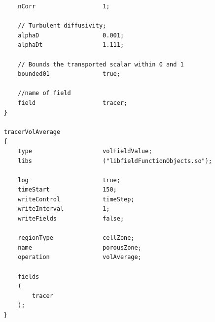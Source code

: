 \begin{refsection}
\begin{lstlisting}
		nCorr					1;

		// Turbulent diffusivity;
		alphaD					0.001;
		alphaDt					1.111;
		
		// Bounds the transported scalar within 0 and 1
		bounded01				true;
		
		//name of field
		field					tracer;
	}
	
	tracerVolAverage
	{
		type            		volFieldValue;
		libs            		("libfieldFunctionObjects.so");
	
		log             		true;
		timeStart				150;
		writeControl			timeStep;
		writeInterval			1;
		writeFields     		false;
			
		regionType      		cellZone;
		name            		porousZone;
		operation       		volAverage;
	
		fields
		(
			tracer
		);
	}
\end{lstlisting}


\end{refsection}
